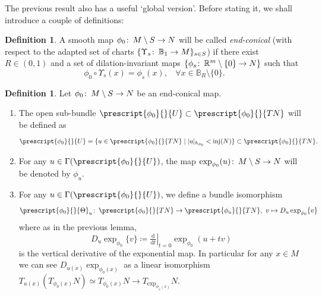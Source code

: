 \documentclass{article}
\numberwithin{equation}{section}        %
\theoremstyle{bfnote}
\theoremstyle{definition}
\newtheorem{Def}[thm]{Definition}           %
\theoremstyle{bfremark}
\newcommand{\col}{\colon \thinspace}        %
\newcommand{\R}{\mathbb{R}}                 %
\newcommand{\Ball}{\mathbb{B}}              %
\newcommand{\diff}{\mathrm{d}}                      %
\DeclareMathOperator{\inj}{inj}                 %
\begin{document}
The previous result also has a useful `global version'. Before stating it, we shall introduce a couple of definitions:

\begin{Def}     \label{Def: End-conical maps I}
    A smooth map $\phi_0 \col M \setminus S \to N$ will be called \emph{end-conical} (with respect to the adapted set of charts $\{\Upsilon_s \col \Ball_1 \to M\}_{s \in S}$) if there exist $R \in (0,1)$ and a set of dilation-invariant maps $\{\phi_s \col \R^m \setminus \{0\} \to N\}$ such that
    \begin{equation*}
        \phi_0 \circ \Upsilon_s (x) = \phi_s(x), ~~~~ \forall x \in \Ball_R \setminus \{0\} .
    \end{equation*}
\end{Def}

\begin{Def}     \label{Def: Bundle isomorphism Theta}
    Let $\phi_0 \col M \setminus S \to N$ be an end-conical map.
    \begin{enumerate}
        \item The open sub-bundle $\prescript{\phi_0}{}{U} \subset \prescript{\phi_0}{}{TN}$ will be defined as
    \begin{equation*}
        \prescript{\phi_0}{}{U} = \{ u \in \prescript{\phi_0}{}{TN} \mid |u|_{h_{\phi_0}} < \inj(N) \} \subset \prescript{\phi_0}{}{TN} .
    \end{equation*}

        \item For any $u \in \Gamma(\prescript{\phi_0}{}{U})$, the map $\exp_{\phi_0}(u) \col M \setminus S \to N$ will be denoted by $\phi_u$.

        \item For any $u \in \Gamma(\prescript{\phi_0}{}{U})$, we define a bundle isomorphism
        \begin{equation*}
            \prescript{\phi_0}{}{\Theta}_u \col \prescript{\phi_0}{}{TN} \to \prescript{\phi_u}{}{TN}, ~ v \mapsto D_u \exp_{\phi_0} \{v\}
        \end{equation*}
        where as in the previous lemma, 
        \begin{equation*}
            D_u \exp_{\phi_0} \{v\} \coloneqq \left. \tfrac{\diff}{\diff t} \right|_{t=0} \exp_{\phi_0}(u+tv)
        \end{equation*}
        is the vertical derivative of the exponential map. In particular for any $x \in M$ we can see $D_{u(x)} \exp_{\phi_0(x)}$ as a linear isomorphism $T_{u(x)}(T_{\phi_0(x)}N) \simeq T_{\phi_0(x)} N \to T_{\exp_{\phi_u(x)}}N$.
    \end{enumerate} 
\end{Def}
\end{document}
